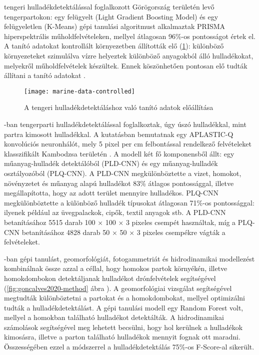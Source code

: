 \cite{Taggio2022} tengeri hulladékdetektálással foglalkozott Görögország területén levő tengerpartokon: egy felügyelt (Light Gradient Boosting Model) és egy felügyeletlen (K-Means) gépi tanulási algoritmust alkalmaztak PRISMA hiperspektrális műholdfelvételeken, mellyel átlagosan 96\%-os pontosságot értek el. A tanító adatokat kontrollált környezetben állították elő (\ref{fig:marine-data-controlled}): különböző környezeteket szimulálva vízre helyeztek különböző anyagokból álló hulladékokat, melyekről műholdfelvételek készültek. Ennek köszönhetően pontosan elő tudták állítani a tanító adatokat .

\begin{figure}[H]
	\centering
	\texttt{[image: marine-data-controlled]}
	\caption{A tengeri hulladékdetektáláshoz való tanító adatok előállítása \cite{Taggio2022}}
    \label{fig:marine-data-controlled}
\end{figure}

\cite{Wolf2020}-ban tengerparti hulladékdetektálással foglalkoztak, úgy úszó hulladékkal, mint partra kimosott hulladékkal. A kutatásban bemutatnak egy APLASTIC-Q konvolúciós neuronhálót, mely 5 pixel per cm felbontással rendelkező felvételeket klasszifikált Kambodzsa területén . A modell két fő komponensből állt: egy műanyag-hulladék detektálóból (PLD-CNN) és egy műanyag-hulladék osztályozóból (PLQ-CNN). A PLD-CNN megkülönböztette a vizet, homokot, növényzetet és műanyag alapú hulladékot 83\% átlagos pontossággal, illetve megállapította, hogy az adott terület mennyire hulladékos. PLQ-CNN megkülönböztette a különböző hulladék típusokat átlagosan 71\%-os pontossággal: ilyenek például az üvegpalackok, cipők, textil anyagok stb. A PLD-CNN betanításához 5515 darab 100 × 100 × 3 pixeles csempét használtak, míg a PLQ-CNN betanításához 4828 darab 50 × 50 × 3 pixeles csempékre vágták a felvételeket. 

\cite{Goncalves2020}-ban gépi tanulást, geomorfológiát, fotogammetriát és hidrodinamikai modellezést kombinálnak össze azzal a céllal, hogy homokos partok környékén, illetve homokdombokon detektáljanak hulladékot drónfelvételek segítségével (\ref{fig:goncalves2020-method} ábra ). A geomorfológiai vizsgálat segítségével megtudták különböztetni a partokat és a homokdombokat, mellyel optimizálni tudták a hulladékdetektálást. A gépi tanulási modell egy Random Forest volt, mellyel a homokban található hulladékot detektálták. A hidrodinamikai számolások segítségével meg lehetett becsülni, hogy hol kerülnek a hulladékok kimosásra, illetve a parton található hulladékok mennyit fognak ott maradni. Összességében ezzel a módszerrel a hulladékdetektálás 75\%-os F-Score-al sikerült.

